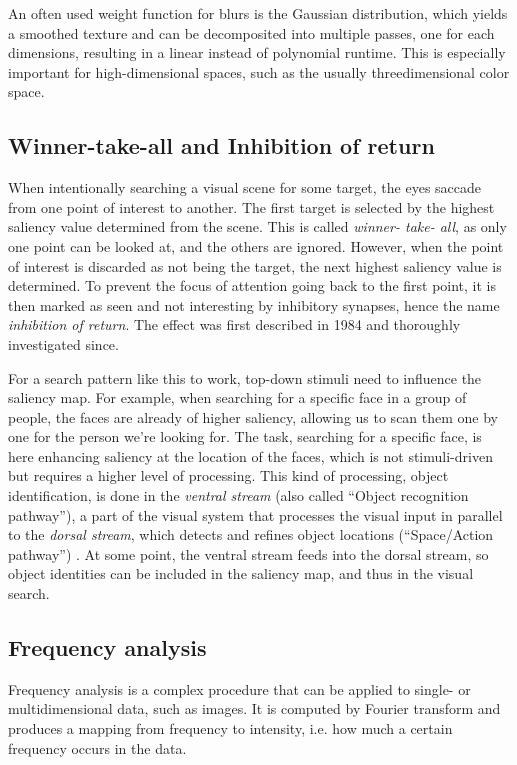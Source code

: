 \documentclass[a4paper,12pt,fleqn,oneside]{scrartcl}
\begin{document}
An often used weight function for blurs is the Gaussian distribution, which yields a smoothed texture and can be
decomposited into multiple passes, one for each dimensions, resulting in a linear instead of polynomial runtime. This is
especially important for high-dimensional spaces, such as the usually threedimensional color space.

\subsection{Winner-take-all and Inhibition of return}

When intentionally searching a visual scene for some target, the eyes saccade from one point of interest to another. The
first target is selected by the highest  saliency value determined from the scene. This is called \emph{winner- take-
all}\cite{klein2008}, as only one point can be looked at, and the others are ignored. However, when the point of
interest is discarded as not being the target, the next highest saliency value is determined. To prevent the focus of
attention going back to the first  point, it is then marked as seen and not interesting by inhibitory synapses, hence
the name \emph{inhibition of return}. The effect was first described in 1984 and thoroughly investigated
since\cite{klein2000}.

For a search pattern like this to work, top-down stimuli need to influence the
saliency map. For example, when searching for a specific face in a group of
people,  the faces are already of higher saliency, allowing us to scan them one
by one for the person we're looking for. The task, searching for a specific
face, is here enhancing saliency at the location of the faces, which is not
stimuli-driven but requires a higher level of processing.  This kind of
processing, object identification, is done in the \emph{ventral stream} (also
called ``Object recognition pathway''), a part of the visual system that
processes the visual input in parallel to the  \emph{dorsal stream}, which
detects and refines object locations (``Space/Action pathway'')
\cite{kruger2013}. At some point, the ventral stream feeds into the dorsal
stream, so object identities can be included in the saliency map, and thus in
the visual search.

\subsection{Frequency analysis}

Frequency analysis is a complex procedure that can be applied to single- or multidimensional data, such as images. It
is computed by Fourier transform and produces a mapping from frequency to intensity, i.e. how much a certain frequency
occurs in the data.
\end{document}
